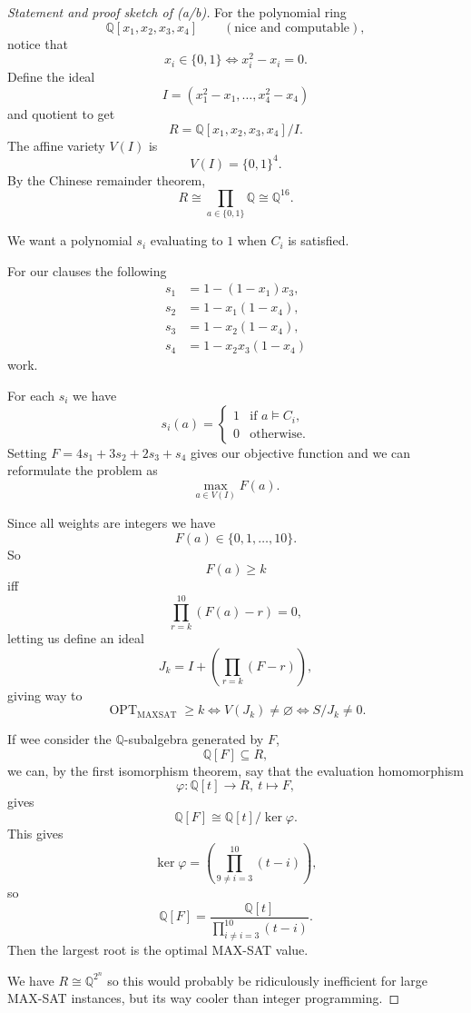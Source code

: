 \documentclass[11pt]{article}
\begin{document}
\begin{proof}[Statement and proof sketch of (a/b)]
    For the polynomial ring 
    \[
        \mathbb Q[x_1,x_2,x_3,x_4] \qquad (\text{nice 
        and computable}),  
    \]
    notice that 
    \[
        x_i \in \{0,1\} \Leftrightarrow 
        x_i^2 - x_i = 0. 
    \]
    Define the ideal 
    \[
        I = (x^2_1 - x_1, \ldots, x_4^2 - x_4) 
    \]
    and quotient to get 
    \[
        R = \mathbb Q[x_1,x_2,x_3,x_4]/I. 
    \]
    The affine variety $V(I)$ is 
    \[
        V(I) = \{0,1\}^4. 
    \]
    By the Chinese remainder theorem, 
    \[
        R \cong \prod_{a \in \{0,1\}} 
        \mathbb Q \cong \mathbb Q^{16}. 
    \]

    We want a polynomial $s_i$ evaluating to $1$ 
    when $C_i$ is satisfied. 

    For our clauses the following  
    \[
        \begin{aligned}
          s_1&=1-(1-x_1)x_3,\\
          s_2&=1-x_1(1-x_4),\\
          s_3&=1-x_2(1-x_4),\\
          s_4&=1-x_2x_3(1-x_4)
        \end{aligned}
    \]
    work. 

    For each $s_i$ we have 
    \[
        s_i(a)=
        \begin{cases}
        1&\text{if }a\models C_i,\\
        0&\text{otherwise}.
        \end{cases}
    \]
    Setting $F = 4s_1 + 3s_2 + 2s_3 + s_4$ gives 
    our objective function and we can reformulate the 
    problem as 
    \[
        \max_{a \in V(I)} F(a).
    \]

    Since all weights are integers we have 
    \[
        F(a) \in \{0,1,\ldots,10\}. 
    \]
    So 
    \[
        F(a) \geq k 
    \]
    iff 
    \[
        \prod_{r = k}^{10} (F(a) - r) = 0, 
    \]
    letting us define an ideal 
    \[
        J_k = I + \left( \prod_{r=k}(F-r)\right), 
    \]
    giving way to 
    \[
        \operatorname{OPT}_{\mathrm{MAXSAT}}\ge k
        \iff
        V(J_k)\ne\varnothing
        \iff
        S/J_k\ne 0.
    \]

    If wee consider the 
    $\mathbb Q$-subalgebra generated by $F$, 
    \[
        \mathbb Q[F] \subseteq R, 
    \] 
    we can, by the first isomorphism theorem, say 
    that the evaluation homomorphism 
    \[
        \varphi : \mathbb Q[t] \to R, \ t \mapsto F, 
    \]
    gives 
    \[
        \mathbb Q[F] \cong \mathbb Q[t]/\ker \varphi. 
    \]
    This gives 
    \[
        \ker \varphi 
        = \left(\prod_{9 \neq i=3}^{10} (t - i)\right),
    \]
    so 
    \[
        \mathbb Q[F] = 
        \frac{\mathbb Q[t]}{\prod_{i \neq i=3}^{10} (t-i)}.
    \]
    Then the largest root is the optimal MAX-SAT value. 

    We have $R \cong \mathbb Q^{2^n}$ so this would 
    probably be ridiculously inefficient for 
    large MAX-SAT instances, but its way 
    cooler than integer programming.     
\end{proof}
\end{document}
